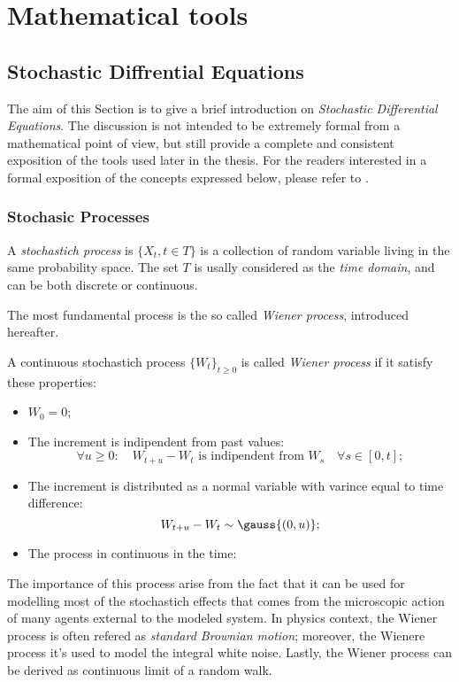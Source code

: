 \chapter{Mathematical tools}
\section{Stochastic Diffrential Equations}
The aim of this Section is to give a brief introduction on \emph{Stochastic Differential Equations}.
The discussion is not intended to be extremely formal from a mathematical point of view,
but still provide a complete and consistent exposition of the tools used later in the thesis.
For the readers interested in a formal exposition of the concepts expressed below, please refer to \cite{morters2010brownian}.

\subsection{Stochasic Processes}
\begin{Definition}
  A \emph{stochastich process} is \(\{X_t, t\in T\}\) is a collection of random variable living in the same probability space.
  The set \(T\) is usally considered as the \emph{time domain}, and can be both discrete or continuous.
\end{Definition}

The most fundamental process is the so called \emph{Wiener process}, introduced hereafter.
\begin{Definition}
  A continuous stochastich process \(\{W_t\}_{t\ge0}\) is called \emph{Wiener process} if it satisfy these properties:
  \begin{itemize}
    \item \(W_0 = 0\);
    \item The increment is indipendent from past values:
          \[\forall u\ge0: \quad W_{t+u} - W_t  \text{ is indipendent from } W_s \quad \forall s\in[0,t];\]
    \item The increment is distributed as a normal variable with varince equal to time difference:
          \[W_{t+u}-W_t \sim \gauss{(0,u)};\]
    \item The process in continuous in the time:
          \[\] %
  \end{itemize}
\end{Definition}
The importance of this process arise from the fact that it can be used for modelling
most of the stochastich effects that comes from the microscopic action of many agents
external to the modeled system.
In physics context, the Wiener process is often refered as \emph{standard Brownian motion};
moreover, the Wienere process it's used to model the integral white noise.
Lastly, the Wiener process can be derived as continuous limit of a random walk.

